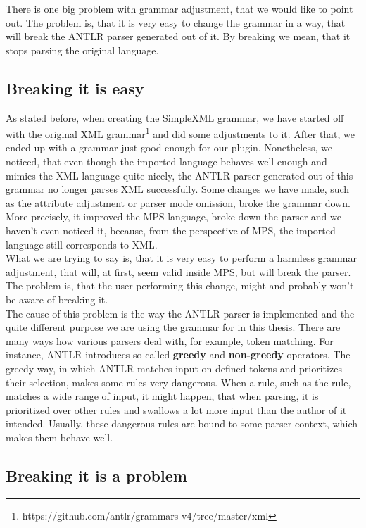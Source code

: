 There is one big problem with grammar adjustment, that we would like to point out.
The problem is, that it is very easy to change the grammar in a way, that will break the ANTLR parser generated out of it.
By breaking we mean, that it stops parsing the original language.

\subsection{Breaking it is easy}

As stated before, when creating the SimpleXML grammar, we have started off with the original XML grammar\footnote{https://github.com/antlr/grammars-v4/tree/master/xml} and did some adjustments to it.
After that, we ended up with a grammar just good enough for our plugin.
Nonetheless, we noticed, that even though the imported language behaves well enough and mimics the XML language quite nicely, the ANTLR parser generated out of this grammar no longer parses XML successfully.
Some changes we have made, such as the attribute adjustment or parser mode omission, broke the grammar down.
More precisely, it improved the MPS language, broke down the parser and we haven't even noticed it, because, from the perspective of MPS, the imported language still corresponds to XML.
\\

What we are trying to say is, that it is very easy to perform a harmless grammar adjustment, that will, at first, seem valid inside MPS, but will break the parser.
The problem is, that the user performing this change, might and probably won't be aware of breaking it.
\\

The cause of this problem is the way the ANTLR parser is implemented and the quite different purpose we are using the grammar for in this thesis.
There are many ways how various parsers deal with, for example, token matching.
For instance, ANTLR introduces so called \textbf{greedy} and \textbf{non-greedy} operators.
The greedy way, in which ANTLR matches input on defined tokens and prioritizes their selection, makes some rules very dangerous.
When a rule, such as the  rule, matches a wide range of input, it might happen, that when parsing, it is prioritized over other rules and swallows a lot more input than the author of it intended.
Usually, these dangerous rules are bound to some parser context, which makes them behave well.

\subsection{Breaking it is a problem}

